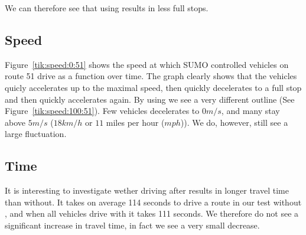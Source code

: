 We can therefore see that using \tech results in less full stops.
%
%

\subsection{Speed}
Figure~\ref{tik:speed:0:51} shows the speed at which SUMO controlled vehicles on route 51 drive as a function over time.
The graph clearly shows that the vehicles quicly accelerates up to the maximal speed, then quickly decelerates to a full stop and then quickly accelerates again.
By using \tech we see a very different outline (See Figure~\ref{tik:speed:100:51}).
Few vehicles decelerates to $0 m/s$, and many stay above $5 m/s$ ($18 km/h$ or $11$ miles per hour ($mph$)).
We do, however, still see a large fluctuation.
%
%

\subsection{Time}
It is interesting to investigate wether driving after \tech results in longer travel time than without.
It takes on average 114 seconds to drive a route in our test without \tech, and when all vehicles drive with \tech it takes 111 seconds. 
We therefore do not see a significant increase in travel time, in fact we see a very small decrease.


